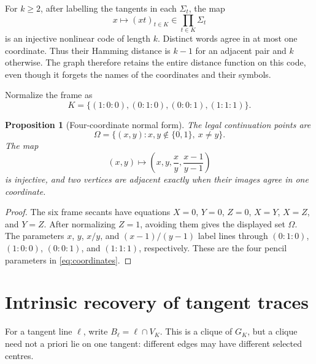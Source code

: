 \documentclass[11pt]{article}
\newtheorem{proposition}[theorem]{Proposition}
\theoremstyle{definition}
\theoremstyle{remark}
\begin{document}
For $k\ge2$, after labelling the tangents in each $\Sigma_t$, the map
\[
  x\longmapsto(xt)_{t\in K}\in\prod_{t\in K}\Sigma_t
\]
is an injective nonlinear code of length $k$.  Distinct words agree in at
most one coordinate. Thus their Hamming distance is $k-1$ for an
adjacent pair and $k$ otherwise. The graph therefore retains the entire
distance function on this code, even though it forgets the names of the
coordinates and their symbols.

Normalize the frame as
\[
 K=\{(1:0:0),(0:1:0),(0:0:1),(1:1:1)\}.
\]

\begin{proposition}[Four-coordinate normal form]\label{prop:normal}
The legal continuation points are
\[
 \Omega=\{(x,y):x,y\notin\{0,1\},\ x\ne y\}.
\]
The map
\begin{equation}
 (x,y)\longmapsto
 \left(x,y,\frac{x}{y},\frac{x-1}{y-1}\right)
 \label{eq:coordinates}
\end{equation}
is injective, and two vertices are adjacent exactly when their images agree
in one coordinate.
\end{proposition}

\begin{proof}
The six frame secants have equations
$X=0$, $Y=0$, $Z=0$, $X=Y$, $X=Z$, and $Y=Z$.
After normalizing $Z=1$, avoiding them gives the displayed set $\Omega$.
The parameters $x$, $y$, $x/y$, and $(x-1)/(y-1)$ label lines through
$(0:1:0)$, $(1:0:0)$, $(0:0:1)$, and $(1:1:1)$, respectively. These
are the four pencil parameters in \eqref{eq:coordinates}.
\end{proof}


\section{Intrinsic recovery of tangent traces}
\label{sec:traces}

For a tangent line $\ell$, write $B_\ell=\ell\cap V_K$.  This is a clique
of $G_K$, but a clique need not a priori lie on one tangent: different
edges may have different selected centres.
\end{document}
